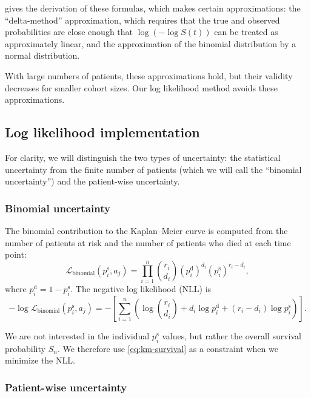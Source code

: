 \documentclass[article]{jss}
\newcommand{\KM}{Kaplan--Meier} %
\begin{document}
\citet{GreenwoodNotes} gives the derivation of these formulas, which makes certain approximations: the ``delta-method'' approximation, which requires that the true and observed probabilities are close enough that \(\log\left(-\log S(t)\right)\) can be treated as approximately linear, and the approximation of the binomial distribution by a normal distribution.

With large numbers of patients, these approximations hold, but their validity decreases for smaller cohort sizes. Our log likelihood method avoids these approximations.

\subsection{Log likelihood implementation}

For clarity, we will distinguish the two types of uncertainty: the statistical uncertainty from the finite number of patients (which we will call the ``binomial uncertainty'') and the patient-wise uncertainty.

\subsubsection{Binomial uncertainty}\label{sec:binomial-uncertainty}

The binomial contribution to the \KM{} curve is computed from the number of patients at risk and the number of patients who died at each time point:
\begin{equation}
\mathcal{L}_{\text{binomial}}(p_i^\text{s}, a_j) = \prod_{i=1}^{n} \binom{r_i}{d_i} {\left(p_i^\text{d}\right)}^{d_i} {\left(p_i^\text{s}\right)}^{r_i-d_i},
\end{equation}
where \(p_i^\text{d} = 1 - p_i^\text{s}\). The negative log likelihood (NLL) is
\begin{equation}
-\log \mathcal{L}_{\text{binomial}}(p_i^\text{s}, a_j) = -\left[\sum_{i=1}^{n} \left( \log\binom{r_i}{d_i} + d_i \log p_i^\text{d} + (r_i-d_i) \log p_i^\text{s} \right)\right]. \label{eq:binomial-nll}
\end{equation}

We are not interested in the individual \(p_i^\text{s}\) values, but rather the overall survival probability \(S_n\). We therefore use \cref{eq:km-survival} as a constraint when we minimize the NLL\@.

\subsubsection{Patient-wise uncertainty}\label{sec:patient-wise-uncertainty}
\end{document}
